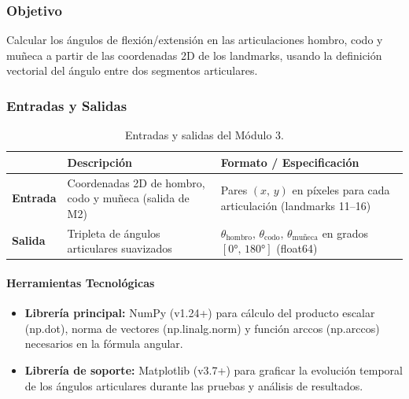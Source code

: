 \subsubsection*{Objetivo}
Calcular los ángulos de flexión/extensión en las articulaciones
hombro, codo y muñeca a partir de las coordenadas 2D de los landmarks,
usando la definición vectorial del ángulo entre dos segmentos
articulares.

\subsubsection*{Entradas y Salidas}

\begin{table}[h!]
\centering
\label{tab:m1_io}
\renewcommand{\arraystretch}{1.3}
\begin{tabularx}{\textwidth}{
    >{\bfseries}p{3cm}
    X
    X
}    
\toprule
&
\textbf{Descripción} &
\textbf{Formato / Especificación} \\
\midrule
Entrada &
  Coordenadas 2D de hombro, codo y muñeca (salida de M2) &
  Pares $(x,\,y)$ en píxeles para cada articulación
  (landmarks 11–16) \\
\midrule
Salida &
  Tripleta de ángulos articulares suavizados &
  $\theta_{\text{hombro}},\,\theta_{\text{codo}},\,
   \theta_{\text{muñeca}}$ en grados $[0°,\,180°]$ (float64) \\
\bottomrule
\end{tabularx}
\caption{Entradas y salidas del Módulo 3.}
\end{table}

\paragraph{Herramientas Tecnológicas}\mbox{}

\begin{itemize}[leftmargin=1.5em]
  \item \textbf{Librería principal:} NumPy (v1.24+) para
        cálculo del producto escalar (np.dot), norma de
        vectores (np.linalg.norm) y función
        arccos (np.arccos) necesarios en la fórmula
        angular.
  \item \textbf{Librería de soporte:} Matplotlib (v3.7+)
        para graficar la evolución temporal de los ángulos articulares
        durante las pruebas y análisis de resultados.
\end{itemize}
 
